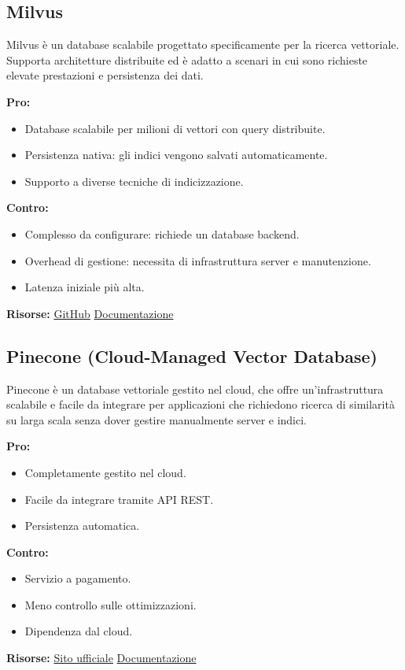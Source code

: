 \documentclass{article}
\begin{document}
\subsection{Milvus}
Milvus è un database scalabile progettato specificamente per la ricerca vettoriale. Supporta architetture distribuite ed è adatto a scenari in cui sono richieste elevate prestazioni e persistenza dei dati.

\textbf{Pro:}
\begin{itemize}
    \item Database scalabile per milioni di vettori con query distribuite.
    \item Persistenza nativa: gli indici vengono salvati automaticamente.
    \item Supporto a diverse tecniche di indicizzazione.
\end{itemize}
\textbf{Contro:}
\begin{itemize}
    \item Complesso da configurare: richiede un database backend.
    \item Overhead di gestione: necessita di infrastruttura server e manutenzione.
    \item Latenza iniziale più alta.
\end{itemize}
\textbf{Risorse:} \href{https://github.com/milvus-io/milvus}{GitHub} \textbar{} \href{https://milvus.io/}{Documentazione}

\subsection{Pinecone (Cloud-Managed Vector Database)}
Pinecone è un database vettoriale gestito nel cloud, che offre un'infrastruttura scalabile e facile da integrare per applicazioni che richiedono ricerca di similarità su larga scala senza dover gestire manualmente server e indici.

\textbf{Pro:}
\begin{itemize}
    \item Completamente gestito nel cloud.
    \item Facile da integrare tramite API REST.
    \item Persistenza automatica.
\end{itemize}
\textbf{Contro:}
\begin{itemize}
    \item Servizio a pagamento.
    \item Meno controllo sulle ottimizzazioni.
    \item Dipendenza dal cloud.
\end{itemize}
\textbf{Risorse:} \href{https://www.pinecone.io/}{Sito ufficiale} \textbar{} \href{https://docs.pinecone.io/}{Documentazione}
\end{document}
